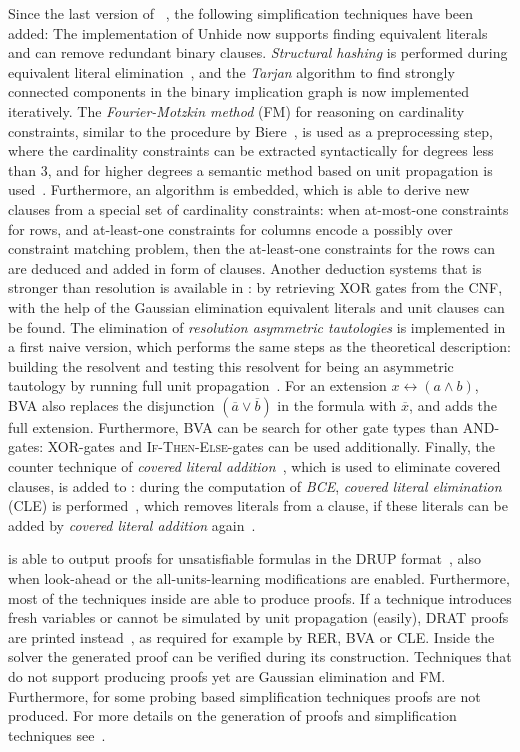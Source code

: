 \documentclass[conference]{IEEEtran}
\begin{document}
Since the last version of \riss~\cite{riss3g}, the following simplification techniques have been added:
The implementation of Unhide now supports finding equivalent literals and can remove redundant binary clauses. 
\emph{Structural hashing} is performed during equivalent literal elimination~\cite{DBLP:conf/dac/KuehlmannK97}, and the \emph{Tarjan} algorithm to find strongly connected components in the binary implication graph is now implemented iteratively. 
The \emph{Fourier-Motzkin method} (FM) for reasoning on cardinality constraints, similar to the procedure by Biere~\cite{treengeling2013}, is used as a preprocessing step, where the cardinality constraints can be extracted syntactically for degrees less than 3, and for higher degrees a semantic method based on unit propagation is used~\cite{lazyCard}. 
Furthermore, an algorithm is embedded, which is able to derive new clauses from a special set of cardinality constraints: when at-most-one constraints for rows, and at-least-one constraints for columns encode a possibly over constraint matching problem, then the at-least-one constraints for the rows can are deduced and added in form of clauses. 
Another deduction systems that is stronger than resolution is available in \coprocessor: by retrieving \textsc{XOR} gates from the CNF, with the help of the Gaussian elimination equivalent literals and unit clauses can be found. 
The elimination of \emph{resolution asymmetric tautologies} is implemented in a first naive version, which performs the same steps as the theoretical description: building the resolvent and testing this resolvent for being an asymmetric tautology by running full unit propagation~\cite{JarvisaloHB:2012}. 
For an extension $x \leftrightarrow (a \land b)$, BVA also replaces the disjunction $(\overline{a} \lor \overline{b})$ in the formula with $\overline{x}$, and adds the full extension. 
Furthermore, BVA can be search for other gate types than \textsc{AND}-gates: \textsc{XOR}-gates and \textsc{If-Then-Else}-gates can be used additionally. 
Finally, the counter technique of \emph{covered literal addition}~\cite{HeuleJB10b}, which is used to eliminate covered clauses, is added to \coprocessor: during the computation of \emph{BCE}, \emph{covered literal elimination} (CLE) is performed~\cite{MantheyP:KI:2014}, which removes literals from a clause, if these literals can be added by \emph{covered literal addition} again~\cite{HeuleJB10b}. 

\riss is able to output proofs for unsatisfiable formulas in the DRUP format~\cite{Goldberg:2003:VPU:789083.1022836,drup}, also when look-ahead or the all-units-learning modifications are enabled. 
Furthermore, most of the techniques inside \coprocessor are able to produce proofs. 
If a technique introduces fresh variables or cannot be simulated by unit propagation (easily), DRAT proofs are printed instead~\cite{drat}, as required for example by RER, BVA or CLE. 
Inside the solver the generated proof can be verified during its construction. 
Techniques that do not support producing proofs yet are Gaussian elimination and FM. 
Furthermore, for some probing based simplification techniques proofs are not produced. 
For more details on the generation of proofs and simplification techniques see~\cite{MantheyP:KI:2014}.
\end{document}
